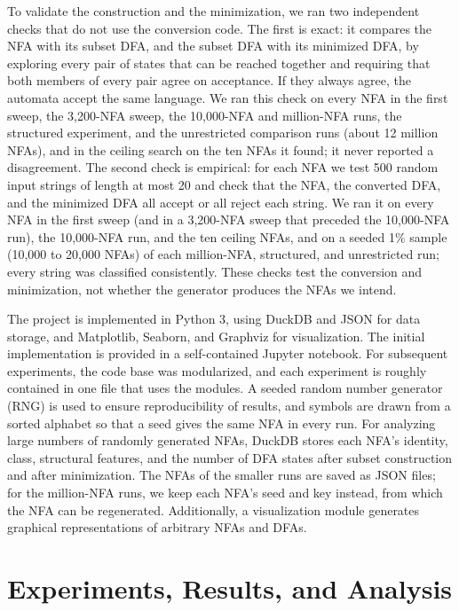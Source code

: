 \documentclass[9pt]{ieeeconf}
\begin{document}
To validate the construction and the minimization, we ran two independent checks that do not use the conversion code. The first is exact: it compares the NFA with its subset DFA, and the subset DFA with its minimized DFA, by exploring every pair of states that can be reached together and requiring that both members of every pair agree on acceptance. If they always agree, the automata accept the same language. We ran this check on every NFA in the first sweep, the 3,200-NFA sweep, the 10,000-NFA and million-NFA runs, the structured experiment, and the unrestricted comparison runs (about 12 million NFAs), and in the ceiling search on the ten NFAs it found; it never reported a disagreement. The second check is empirical: for each NFA we test 500 random input strings of length at most 20 and check that the NFA, the converted DFA, and the minimized DFA all accept or all reject each string. We ran it on every NFA in the first sweep (and in a 3,200-NFA sweep that preceded the 10,000-NFA run), the 10,000-NFA run, and the ten ceiling NFAs, and on a seeded 1\% sample (10,000 to 20,000 NFAs) of each million-NFA, structured, and unrestricted run; every string was classified consistently. These checks test the conversion and minimization, not whether the generator produces the NFAs we intend.

The project is implemented in Python 3, using DuckDB and JSON for data storage, and Matplotlib, Seaborn, and Graphviz for visualization. The initial implementation is provided in a self-contained Jupyter notebook. For subsequent experiments, the code base was modularized, and each experiment is roughly contained in one file that uses the modules. A seeded random number generator (RNG) is used to ensure reproducibility of results, and symbols are drawn from a sorted alphabet so that a seed gives the same NFA in every run. For analyzing large numbers of randomly generated NFAs, DuckDB stores each NFA's identity, class, structural features, and the number of DFA states after subset construction and after minimization. The NFAs of the smaller runs are saved as JSON files; for the million-NFA runs, we keep each NFA's seed and key instead, from which the NFA can be regenerated. Additionally, a visualization module generates graphical representations of arbitrary NFAs and DFAs.

\section{Experiments, Results, and Analysis}
\label{sec:results}
\end{document}
